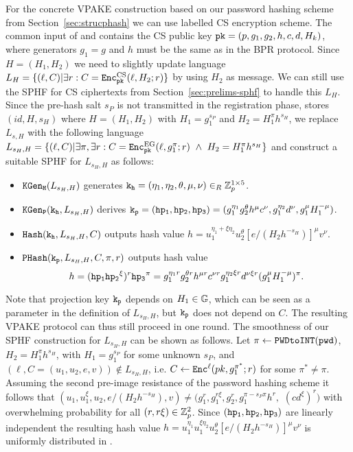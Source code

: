 For the concrete \ac{VPAKE} construction based on our password hashing scheme from Section~\ref{sec:strucphash} we can use labelled \ac{CS} encryption scheme. 
The common input of \Client and \Server contains the \ac{CS} public key $\mathtt{pk}=(p,g_1,g_2,h,c,d,H_k)$, where generators $g_1=g$ and $h$ must be the same as in the \ac{BPR} protocol. 
Since $H=(H_1,H_2)$ we need to slightly update language $L_H = \{(\ell, C) | \exists r : C = \mathtt{Enc}^\mathrm{CS}_\mathtt{pk}(\ell, H_2; r)\}$ by using $H_2$ as message. 
We can still use the \ac{SPHF} for \ac{CS} ciphertexts from Section~\ref{sec:prelims-sphf} to handle this $L_H$. 
Since the pre-hash salt $s_P$ is not transmitted in the registration phase, \ie \Server stores $(id, H, s_H)$ where $H=(H_1, H_2)$ with $H_1=g_1^{s_P}$ and $H_2 = H_1^\pi h^{s_H}$, we replace $L_{s,H}$ with the following language $L_{s_H,H} = \{(\ell, C) | \exists \pi, \exists r : C = \mathtt{Enc}^\mathrm{EG}_\mathtt{pk}(\ell, g_1^\pi; r)\ \wedge\ H_2 = H_1^\pi h^{s_H}\}$ and construct a suitable \ac{SPHF} for $L_{s_H,H}$ as follows:
\begin{itemize}
	\item $\mathtt{KGen_H}(L_{s_H,H})$ generates $\mathtt{k_h}=(\eta_1,\eta_2,\theta,\mu,\nu)\in_R\mathbb{Z}_p^{1\times 5}$.

	\item $\mathtt{KGen_P}(\mathtt{k_h},L_{s_H,H})$ derives $\mathtt{k_p}=(\mathtt{hp_{1}},\mathtt{hp_{2}},\mathtt{hp_{3}})=(g_1^{\eta_1}g_2^{\theta}h^\mu c^\nu, g_1^{\eta_2}d^\nu, g_1^\mu H_1^{-\mu})$.

	\item $\mathtt{Hash}(\mathtt{k_h},L_{s_H,H},C)$ outputs hash value $h=u_1^{\eta_1+\xi\eta_2}u_2^{\theta}[e/(H_2h^{-s_H})]^\mu v^\nu$.

	\item $\mathtt{PHash}(\mathtt{k_p},L_{s_H,H},C,\pi,r)$ outputs hash value \[h=(\mathtt{hp_{1}}\mathtt{hp_{2}}^\xi)^r\mathtt{hp_{3}}^{\pi}=g_1^{\eta_1r}g_2^{\theta r}h^{\mu r} c^{\nu r}g_1^{\eta_2\xi r}d^{\nu\xi r}(g_1^\mu H_1^{-\mu})^{\pi}.\]
\end{itemize}
Note that projection key $\mathtt{k_p}$ depends on $H_1\in \mathbb{G}$, which can be seen as a parameter in the definition of $L_{s_H,H}$, but $\mathtt{k_p}$ does not depend on $C$. The resulting \ac{VPAKE} protocol can thus still proceed in one round. 
The smoothness of our \ac{SPHF} construction for $L_{s_H,H}$ can be shown as follows. 
Let $\pi\gets\texttt{PWDtoINT}(\mathtt{pwd})$, $H_2 = H_1^\pi h^{s_H}$, with $H_1=g_1^{s_P}$ for some unknown $s_P$, and $(\ell,C=(u_1,u_2,e,v))\not\in L_{s_H,H}$, i.e. $C\gets\mathtt{Enc}^\ell(pk,g_1^{\pi^\ast};r)$ for some $\pi^\ast\not=\pi$. 
Assuming the second pre-image resistance of the password hashing scheme it follows that $(u_1, u_1^\xi, u_2, e/(H_2h^{-s_H}), v) \not= (g_1^r, g_1^{r\xi}, g_2^r, g_1^{\pi-s_P\pi}h^r,$ $(cd^\xi)^r)$ with overwhelming probability for all $(r,r\xi)\in\mathbb{Z}_p^2$. 
Since $(\mathtt{hp_{1}},\mathtt{hp_{2}},\mathtt{hp_{3}})$ are linearly independent the resulting hash value $h= u_1^{\eta_1} u_1^{\xi\eta_2} u_2^\theta [e/(H_2h^{-s_H})]^\mu v^\nu$ is uniformly distributed in \GG. 

